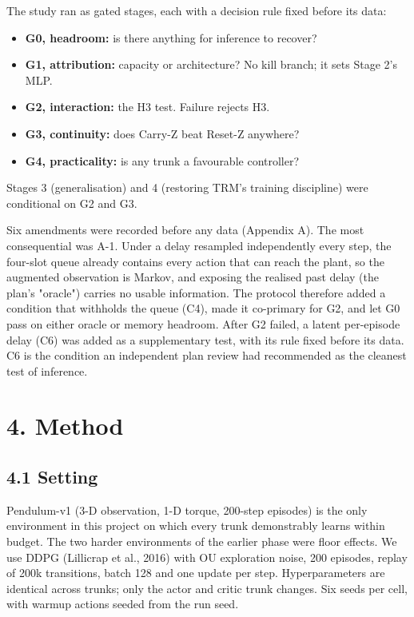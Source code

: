 \documentclass[11pt]{article}
\begin{document}
The study ran as gated stages, each with a decision rule fixed before its data:

\begin{itemize}
\item \textbf{G0, headroom:} is there anything for inference to recover?
\item \textbf{G1, attribution:} capacity or architecture? No kill branch; it sets Stage 2's MLP.
\item \textbf{G2, interaction:} the H3 test. Failure rejects H3.
\item \textbf{G3, continuity:} does Carry-Z beat Reset-Z anywhere?
\item \textbf{G4, practicality:} is any trunk a favourable controller?
\end{itemize}



Stages 3 (generalisation) and 4 (restoring TRM's training discipline) were conditional on G2 and G3.



Six amendments were recorded before any data (Appendix A). The most consequential was A-1. Under a delay resampled independently every step, the four-slot queue already contains every action that can reach the plant, so the augmented observation is Markov, and exposing the realised past delay (the plan's "oracle") carries no usable information. The protocol therefore added a condition that withholds the queue (C4), made it co-primary for G2, and let G0 pass on either oracle or memory headroom. After G2 failed, a latent per-episode delay (C6) was added as a supplementary test, with its rule fixed before its data. C6 is the condition an independent plan review had recommended as the cleanest test of inference.



\section*{4. Method}



\subsection*{4.1 Setting}



Pendulum-v1 (3-D observation, 1-D torque, 200-step episodes) is the only environment in this project on which every trunk demonstrably learns within budget. The two harder environments of the earlier phase were floor effects. We use DDPG (Lillicrap et al., 2016) with OU exploration noise, 200 episodes, replay of 200k transitions, batch 128 and one update per step. Hyperparameters are identical across trunks; only the actor and critic trunk changes. Six seeds per cell, with warmup actions seeded from the run seed.
\end{document}
